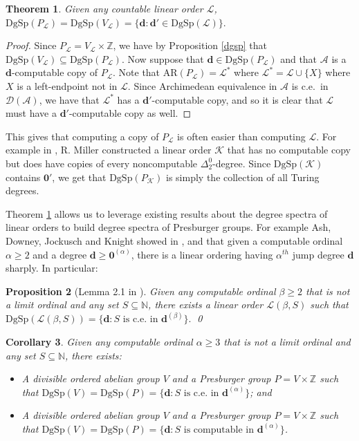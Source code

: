 \documentclass{amsart}%
\newtheorem{theorem}{Theorem}
\numberwithin{theorem}{section}
\newtheorem{corollary}[theorem]{Corollary}
\newtheorem{proposition}[theorem]{Proposition}
\newcommand{\AR}{\text{AR}}
\newcommand{\Z}{\mathbb{Z}}
\newcommand{\N}{\mathbb{N}}
\newcommand{\A}{\mathcal{A}}
\newcommand{\D}{\mathcal{D}}
\newcommand{\0}{\emptyset}
\newcommand{\ddd}{\boldsymbol{d}}
\newcommand{\LL}{\mathcal{L}}
\newcommand{\dgsp}{\text{DgSp}}
\begin{document}
\begin{theorem}
\label{L'}
    Given any countable linear order $\LL$,
    $\dgsp(P_\LL)=\dgsp(V_\LL)=\{\ddd:\ddd'\in \dgsp(\LL)\}. $
\end{theorem}

\begin{proof}
    Since $P_\LL= V_\LL \times \Z$, we have by Proposition \ref{dgsp} that $\dgsp(V_\LL)\subseteq\dgsp(P_\LL)$. Now suppose that $\ddd\in \dgsp(P_\LL)$ and that $\A$ is a $\ddd$-computable copy of $P_\LL$. Note that $\AR(P_\LL)= \LL^*$ where $\LL^*=\LL\cup \{X\}$ where $X$ is a left-endpoint not in $\LL$. Since Archimedean equivalence in $\A$ is c.e.\ in $\D(\A)$, we have that $\LL^*$ has a $\ddd'$-computable copy, and so it is clear that $\LL$ must have a $\ddd'$-computable copy as well.  
\end{proof}

This gives that computing a copy of $P_\LL$ is often easier than computing $\LL$. For example in \cite{Russell-D2}, R. Miller constructed a linear order $\mathcal{K}$ that has no computable copy but does have copies of every noncomputable $\Delta^0_2$-degree. Since $\dgsp(\mathcal{K})$ contains $\boldsymbol{0}'$, we get that $\dgsp(P_\mathcal{K})$ is simply the collection of all Turing degrees.

Theorem \ref{L'} allows us to leverage existing results about the degree spectra of linear orders to build degree spectra of Presburger groups. For example Ash, Downey, Jockusch and Knight showed in  
\cite{jumps-of-orderings}, \cite{AK} and \cite{Jump-degrees} that given a computable ordinal $\alpha\geq 2$ and a degree $\ddd\geq \boldsymbol{0}^{(\alpha)}$, there is a linear ordering having $\alpha^{th}$ jump degree $\ddd$ sharply. In particular: 

\begin{proposition}[Lemma 2.1 in \cite{Jump-degrees}]
\label{Jump-degrees lemma}
    Given any computable ordinal $\beta\geq 2$ that is not a limit ordinal and any set $S\subseteq \N$, there exists a linear order $\LL(\beta,S)$ such that $\dgsp(\LL(\beta, S))=\{\ddd: S \text{ is c.e.\ in } \ddd^{(\beta)}\}.$ \qed
\end{proposition}

\begin{corollary}
\label{jumps cor}
Given any computable ordinal $\alpha\geq 3$ that is not a limit ordinal and any set $S\subseteq \N$, there exists: \begin{itemize}
    \item[(1)] A divisible ordered abelian group $V$ and a Presburger group $P=V\times \Z$ such that $\dgsp(V)=\dgsp(P)=\{\ddd:S \text{ is c.e.\ in } \ddd^{(\alpha)}\} $; and
    \item[(2)] A divisible ordered abelian group $V$ and a Presburger group $P=V\times \Z$ such that $\dgsp(V)=\dgsp(P)=\{\ddd:S \text{ is computable in } \ddd^{(\alpha)}\} $.
\end{itemize}
\end{corollary}
\end{document}
